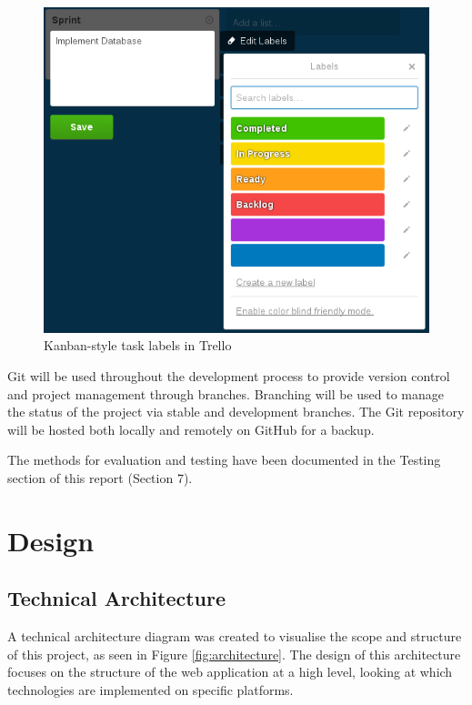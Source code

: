 \documentclass[a4paper, 12pt]{article}
\begin{document}
\begin{figure}[h]
	\centering
	\includegraphics[scale=0.7]{kanban}
	\caption{Kanban-style task labels in Trello}
	\label{fig:kanban}
\end{figure}

Git will be used throughout the development process to provide version control and project management through branches. Branching will be used to manage the status of the project via stable and development branches. The Git repository will be hosted both locally and remotely on GitHub for a backup.

The methods for evaluation and testing have been documented in the Testing section of this report (Section 7).

\section{Design}
\subsection{Technical Architecture}
A technical architecture diagram was created to visualise the scope and structure of this project, as seen in Figure \ref{fig:architecture}. The design of this architecture focuses on the structure of the web application at a high level, looking at which technologies are implemented on specific platforms.
\end{document}
